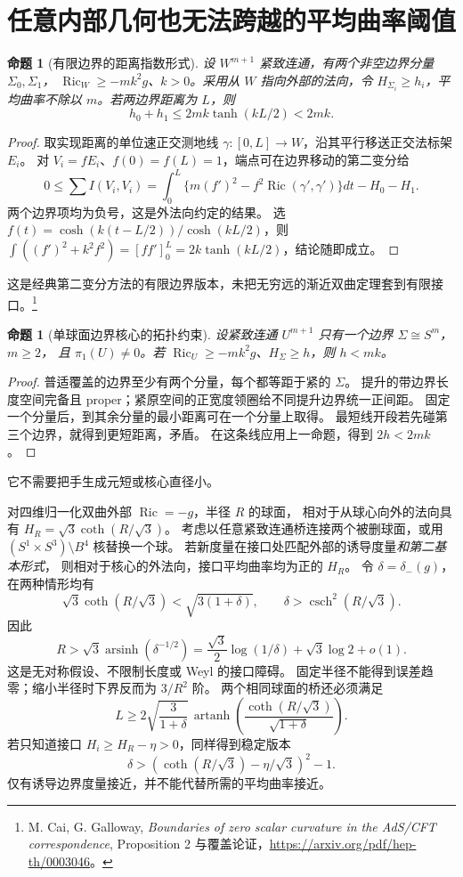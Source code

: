 \documentclass[UTF8,fontset=fandol,zihao=-4,oneside,openany]{ctexbook}
\theoremstyle{cjkplain}
\newtheorem{proposition}[theorem]{命题}
\numberwithin{equation}{chapter}
\DeclareMathOperator{\Ric}{Ric}
\begin{document}
\section{任意内部几何也无法跨越的平均曲率阈值}
\label{FND:boundarymean}

\begin{proposition}[有限边界的距离指数形式]
设 \(W^{m+1}\) 紧致连通，有两个非空边界分量 \(\Sigma_0,\Sigma_1\)，
\(\Ric_W\ge-mk^2g\)、\(k>0\)。采用从 \(W\) 指向外部的法向，令
\(H_{\Sigma_i}\ge h_i\)，平均曲率不除以 \(m\)。若两边界距离为 \(L\)，则
\[
h_0+h_1\le2mk\tanh(kL/2)<2mk.
\]
\end{proposition}
\begin{proof}
取实现距离的单位速正交测地线 \(\gamma:[0,L]\to W\)，沿其平行移送正交法标架 \(E_i\)。
对 \(V_i=fE_i\)、\(f(0)=f(L)=1\)，端点可在边界移动的第二变分给
\[
0\le\sum I(V_i,V_i)
=\int_0^L\{m(f')^2-f^2\Ric(\gamma',\gamma')\}dt-H_0-H_1.
\]
两个边界项均为负号，这是外法向约定的结果。
选 \(f(t)=\cosh(k(t-L/2))/\cosh(kL/2)\)，则
\(\int((f')^2+k^2f^2)=[ff']_0^L=2k\tanh(kL/2)\)，结论随即成立。
\end{proof}
这是经典第二变分方法的有限边界版本，未把无穷远的渐近双曲定理套到有限接口。\footnote{M. Cai, G. Galloway, \emph{Boundaries of zero scalar curvature in the AdS/CFT correspondence}, Proposition 2 与覆盖论证，\url{https://arxiv.org/pdf/hep-th/0003046}。}

\begin{proposition}[单球面边界核心的拓扑约束]
设紧致连通 \(U^{m+1}\) 只有一个边界 \(\Sigma\cong S^m\)，\(m\ge2\)，
且 \(\pi_1(U)\ne0\)。若 \(\Ric_U\ge-mk^2g\)、\(H_\Sigma\ge h\)，则 \(h<mk\)。
\end{proposition}
\begin{proof}
普适覆盖的边界至少有两个分量，每个都等距于紧的 \(\Sigma\)。
提升的带边界长度空间完备且 proper；紧原空间的正宽度领圈给不同提升边界统一正间距。
固定一个分量后，到其余分量的最小距离可在一个分量上取得。
最短线开段若先碰第三个边界，就得到更短距离，矛盾。
在这条线应用上一命题，得到 \(2h<2mk\)。
\end{proof}
它不需要把手生成元短或核心直径小。

对四维归一化双曲外部 \(\Ric=-g\)，半径 \(R\) 的球面，
相对于从球心向外的法向具有
\(H_R=\sqrt3\coth(R/\sqrt3)\)。
考虑以任意紧致连通桥连接两个被删球面，或用
\((S^1\times S^3)\setminus B^4\) 核替换一个球。
若新度量在接口处匹配外部的诱导度量\emph{和第二基本形式}，
则相对于核心的外法向，接口平均曲率均为正的 \(H_R\)。
令 \(\delta=\delta_-(g)\)，在两种情形均有
\[
\sqrt3\coth(R/\sqrt3)<\sqrt{3(1+\delta)},
\qquad
\boxed{\delta>\operatorname{csch}^2(R/\sqrt3).}
\]
因此
\[
R>\sqrt3\operatorname{arsinh}(\delta^{-1/2})
=\frac{\sqrt3}{2}\log(1/\delta)+\sqrt3\log2+o(1).
\]
这是无对称假设、不限制长度或 Weyl 的接口障碍。
固定半径不能得到误差趋零；缩小半径时下界反而为 \(3/R^2\) 阶。
两个相同球面的桥还必须满足
\[
L\ge2\sqrt{\frac3{1+\delta}}\,
\operatorname{artanh}\!\left(
\frac{\coth(R/\sqrt3)}{\sqrt{1+\delta}}\right).
\]
若只知道接口 \(H_i\ge H_R-\eta>0\)，同样得到稳定版本
\[
\delta>\left(\coth(R/\sqrt3)-\eta/\sqrt3\right)^2-1.
\]
仅有诱导边界度量接近，并不能代替所需的平均曲率接近。
\end{document}
